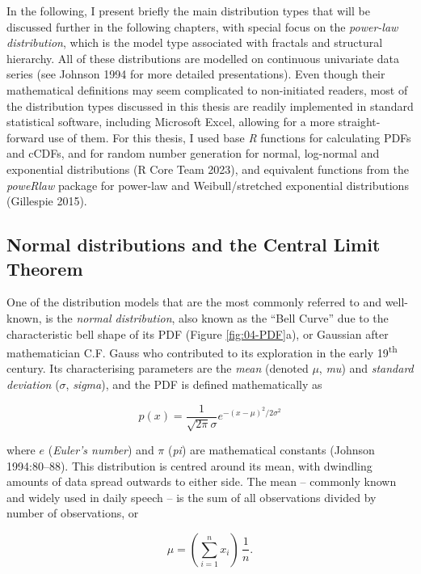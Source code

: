 \documentclass[
  12pt,
]{book}
\begin{document}
In the following, I present briefly the main distribution types that will be discussed further in the following chapters, with special focus on the \emph{power-law distribution}, which is the model type associated with fractals and structural hierarchy. All of these distributions are modelled on continuous univariate data series (see Johnson 1994 for more detailed presentations). Even though their mathematical definitions may seem complicated to non-initiated readers, most of the distribution types discussed in this thesis are readily implemented in standard statistical software, including Microsoft Excel, allowing for a more straight-forward use of them. For this thesis, I used base \emph{R} functions for calculating PDFs and cCDFs, and for random number generation for normal, log-normal and exponential distributions (R Core Team 2023), and equivalent functions from the \emph{poweRlaw} package for power-law and Weibull/stretched exponential distributions (Gillespie 2015).

\FloatBarrier

\hypertarget{normal-dist}{%
\subsection{Normal distributions and the Central Limit Theorem}\label{normal-dist}}

One of the distribution models that are the most commonly referred to and well-known, is the \emph{normal distribution}, also known as the ``Bell Curve'' due to the characteristic bell shape of its PDF (Figure \ref{fig:04-PDF}a), or Gaussian after mathematician C.F. Gauss who contributed to its exploration in the early 19\textsuperscript{th} century. Its characterising parameters are the \emph{mean} (denoted \(\mu\), \emph{mu}) and \emph{standard deviation} (\(\sigma\), \emph{sigma}), and the PDF is defined mathematically as

\begin{equation}
p(x)=\frac{1}{\sqrt{2\pi}\sigma}e^{-(x-\mu)^2/2\sigma^2}
\label{eq:normal}
\end{equation}

where \(e\) (\emph{Euler's number}) and \(\pi\) (\emph{pi}) are mathematical constants (Johnson 1994:80--88). This distribution is centred around its mean, with dwindling amounts of data spread outwards to either side. The mean -- commonly known and widely used in daily speech -- is the sum of all observations divided by number of observations, or

\begin{equation}
\mu = (\sum_{i=1}^nx_i)\,\frac{1}{n}.
\label{eq:mu}
\end{equation}
\end{document}
